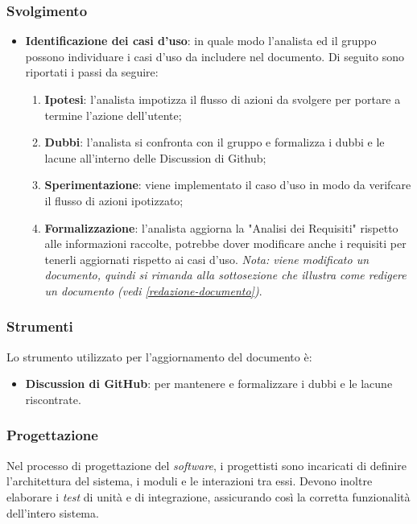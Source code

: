 \subsubsection*{Svolgimento}
\begin{itemize}
	\item \textbf{Identificazione dei casi d'uso}: in quale modo l'analista ed il gruppo possono individuare i casi d'uso da includere nel documento.
		Di seguito sono riportati i passi da seguire:
		\begin{enumerate}
			\item \textbf{Ipotesi}: l'analista impotizza il flusso di azioni da svolgere per portare a termine l'azione dell'utente;
			\item \textbf{Dubbi}: l'analista si confronta con il gruppo e formalizza i dubbi e le lacune all'interno delle Discussion di Github\g;
			\item \textbf{Sperimentazione}: viene implementato il caso d'uso in modo da verifcare il flusso di azioni ipotizzato;
			\item \textbf{Formalizzazione}: l'analista aggiorna la "Analisi dei Requisiti" rispetto alle informazioni raccolte, potrebbe dover modificare anche i requisiti per tenerli aggiornati rispetto ai casi d'uso. 
			\textit{Nota: viene modificato un documento, quindi si rimanda alla sottosezione che illustra come redigere un documento (vedi \cref{redazione-documento})}.
		\end{enumerate}
\end{itemize}

\subsubsection*{Strumenti}
Lo strumento utilizzato per l'aggiornamento del documento è:
\begin{itemize}
	\item \textbf{Discussion di GitHub\g}: per mantenere e formalizzare i dubbi e le lacune riscontrate.
\end{itemize}





\subsubsection{Progettazione}
\label{progettazione}
Nel processo di progettazione del \textit{software}, i progettisti sono incaricati di definire l'architettura del sistema, i moduli e le interazioni tra essi. 
Devono inoltre elaborare i \textit{\textit{test}} di unità e di integrazione, assicurando così la corretta funzionalità dell'intero sistema.


